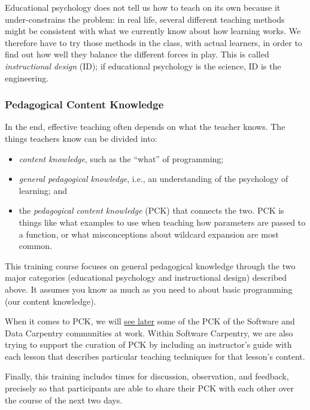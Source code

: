 Educational psychology does not tell us how to teach on its own
because it under-constrains the problem:
in real life,
several different teaching methods might be consistent with what we currently know about how learning works.
We therefore have to try those methods in the class,
with actual learners,
in order to find out how well they balance the different forces in play.
This is called \emph{instructional design} (ID);
if educational psychology is the science,
ID is the engineering.

\subsubsection*{Pedagogical Content Knowledge}

In the end, effective teaching often depends on what the teacher knows.
The things teachers know can be divided into:

\begin{itemize}
\item \emph{content knowledge}, such as the ``what'' of programming;
\item \emph{general pedagogical knowledge}, i.e., an understanding of the
psychology of learning; and
\item the \emph{pedagogical content knowledge} (PCK) that connects the two.
PCK is things like what examples to use when teaching how parameters are passed to a function,
or what misconceptions about wildcard expansion are most common.
\end{itemize}


This training course focuses on general pedagogical knowledge
through the two major categories
(educational psychology and instructional design) described above.
It assumes you know as much as you need to about basic programming
(our content knowledge).

When it comes to PCK,
we will \href{\{\{ page.root \}\}/16-practices/}{see later}
some of the PCK of the Software and Data Carpentry communities at work.  Within
Software Carpentry, we are also trying to support the curation of PCK by including
an instructor's guide with each lesson that describes particular teaching
techniques for that lesson's content.

Finally, this training includes times for discussion, observation, and feedback,
precisely so that participants are able to share their PCK with each other over
the course of the next two days.

